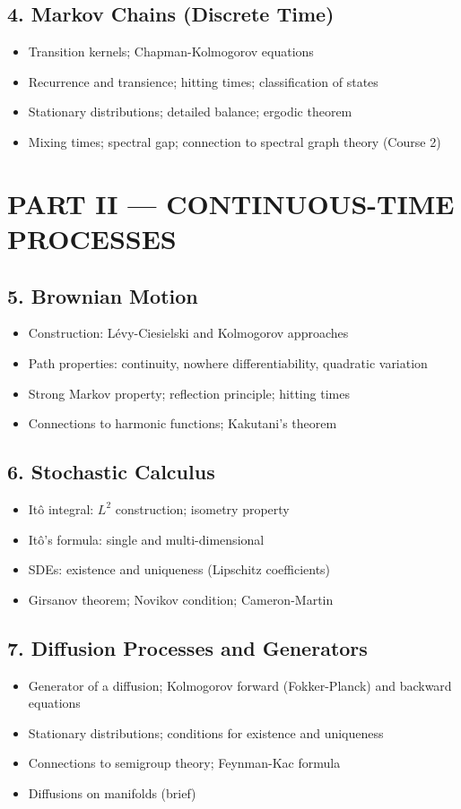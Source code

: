 \subsection{4. Markov Chains (Discrete Time)}
\begin{itemize}
\item Transition kernels; Chapman-Kolmogorov equations
\item Recurrence and transience; hitting times; classification of states
\item Stationary distributions; detailed balance; ergodic theorem
\item Mixing times; spectral gap; connection to spectral graph theory (Course 2)
\end{itemize}

\section{PART II --- CONTINUOUS-TIME PROCESSES}

\subsection{5. Brownian Motion}
\begin{itemize}
\item Construction: L\'evy-Ciesielski and Kolmogorov approaches
\item Path properties: continuity, nowhere differentiability, quadratic variation
\item Strong Markov property; reflection principle; hitting times
\item Connections to harmonic functions; Kakutani's theorem
\end{itemize}

\subsection{6. Stochastic Calculus}
\begin{itemize}
\item It\^o integral: $L^2$ construction; isometry property
\item It\^o's formula: single and multi-dimensional
\item SDEs: existence and uniqueness (Lipschitz coefficients)
\item Girsanov theorem; Novikov condition; Cameron-Martin
\end{itemize}

\subsection{7. Diffusion Processes and Generators}
\begin{itemize}
\item Generator of a diffusion; Kolmogorov forward (Fokker-Planck) and backward equations
\item Stationary distributions; conditions for existence and uniqueness
\item Connections to semigroup theory; Feynman-Kac formula
\item Diffusions on manifolds (brief)
\end{itemize}

